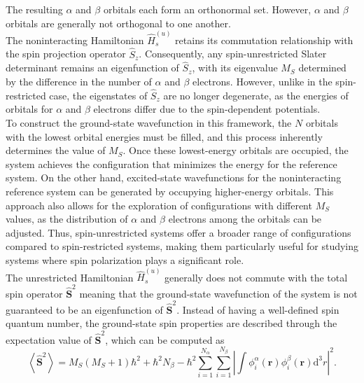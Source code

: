 \documentclass[%
 preprint, linenumbers,
 amsmath,amssymb,
 aps, physrev,
]{revtex4-2}
\begin{document}
The resulting $\alpha$ and $\beta$ orbitals each form an orthonormal set. However, $\alpha$ and $\beta$ orbitals are generally not orthogonal to one another.\\

The noninteracting Hamiltonian $\hat{H}_s^{(u)}$ retains its commutation relationship with the spin projection operator $\hat{S}_z$. Consequently, any spin-unrestricted Slater determinant remains an eigenfunction of $\hat{S}_z$, with its eigenvalue $M_S$ determined by the difference in the number of $\alpha$ and $\beta$ electrons. However, unlike in the spin-restricted case, the eigenstates of $\hat{S}_z$ are no longer degenerate, as the energies of orbitals for $\alpha$ and $\beta$ electrons differ due to the spin-dependent potentials.\\

To construct the ground-state wavefunction in this framework, the $N$ orbitals with the lowest orbital energies must be filled, and this process inherently determines the value of $M_S$. Once these lowest-energy orbitals are occupied, the system achieves the configuration that minimizes the energy for the reference system. On the other hand, excited-state wavefunctions for the noninteracting reference system can be generated by occupying higher-energy orbitals. This approach also allows for the exploration of configurations with different $M_S$ values, as the distribution of $\alpha$ and $\beta$ electrons among the orbitals can be adjusted. Thus, spin-unrestricted systems offer a broader range of configurations compared to spin-restricted systems, making them particularly useful for studying systems where spin polarization plays a significant role.\\

The unrestricted Hamiltonian $\hat{H}_s^{(u)}$ generally does not commute with the total spin operator $\hat{\mathbf{S}}^2$ meaning that the ground-state wavefunction of the system is not guaranteed to be an eigenfunction of $\hat{\mathbf{S}}^2$. Instead of having a well-defined spin quantum number, the ground-state spin properties are described through the expectation value of $\hat{\mathbf{S}}^2$, which can be computed as
\begin{equation}
    \left\langle  \hat{\mathbf{S}}^2 \right\rangle = M_S(M_S+1)\hbar^2 + \hbar^2N_{\beta} - \hbar^2\sum_{i=1}^{N_{\alpha}}\sum_{i=1}^{N_{\beta}}\left| \int\phi_i^{\alpha}(\mathbf{r})\phi_i^{\beta}(\mathbf{r})\mathrm{d}^3r \right|^2.
\end{equation}
\end{document}
